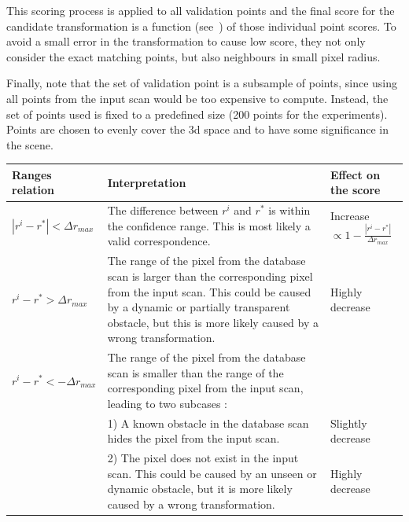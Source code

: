 This scoring process is applied to all validation points and the final score for the candidate transformation is a function (see~\citep[Equation~1]{Steder2011b}) of those individual point scores. To avoid a small error in the transformation to cause low score, they not only consider the exact matching points, but also neighbours in small pixel radius.

Finally, note that the set of validation point is a subsample of points, since using all points from the input scan would be too expensive to compute. Instead, the set of points used is fixed to a predefined size (200 points for the experiments). Points are chosen to evenly cover the \gls*{3d} space and to have some significance in the scene. 

\begin{table}
    \centering
    \begin{tabular}{@{}p{}p{}p{}@{}}
        \toprule %
        \textbf{Ranges relation}         & \textbf{Interpretation}                                                                                                    & \textbf{Effect on the score} \\
        \hline
        $|r^i - r^*| < \Delta r_{max}$   & The difference between $r^i$ and $r^*$ is within the confidence range. This is most likely a valid correspondence.      & Increase $\propto 1-\frac{|r^i-r^*|}{\Delta r_{max}}$ \\
        $r^i - r^* > \Delta r_{max}$     & The range of the pixel from the database scan is larger than the corresponding pixel from the input scan. This could be caused by a dynamic or partially transparent obstacle, but this is more likely caused by a wrong transformation. & Highly decrease \\
        $r^i - r^* < -\Delta r_{max}$    & The range of the pixel from the database scan is smaller than the range of the corresponding pixel from the input scan, leading to two subcases : & \\
                                         & 1) A known obstacle in the database scan hides the pixel from the input scan.                                           & Slightly decrease \\
                                         & 2) The pixel does not exist in the input scan. This could be caused by an unseen or dynamic obstacle, but it is more likely caused by a wrong transformation.       & Highly decrease \\

\end{tabular}
\end{table}
